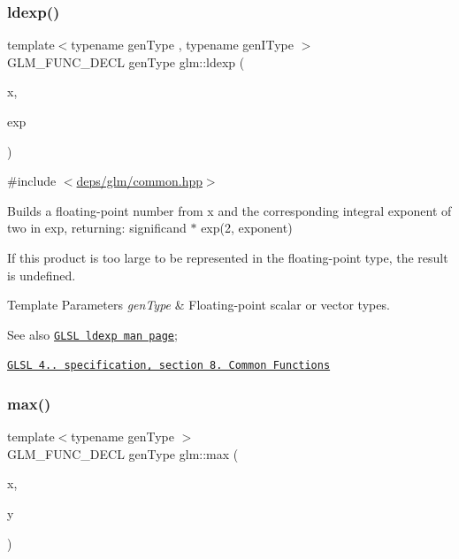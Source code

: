 \mbox{\label{group__core__func__common_ga52e319d7289b849ec92055abd4830533}} 
\subsubsection{\texorpdfstring{ldexp()}{ldexp()}}
{\footnotesize\ttfamily template$<$typename gen\+Type , typename gen\+I\+Type $>$ \\
G\+L\+M\+\_\+\+F\+U\+N\+C\+\_\+\+D\+E\+CL gen\+Type glm\+::ldexp (\begin{DoxyParamCaption}\item[{gen\+Type const \&}]{x,  }\item[{gen\+I\+Type const \&}]{exp }\end{DoxyParamCaption})}



{\ttfamily \#include $<$\hyperlink{common_8hpp}{deps/glm/common.\+hpp}$>$}

Builds a floating-\/point number from x and the corresponding integral exponent of two in exp, returning\+: significand $\ast$ exp(2, exponent)

If this product is too large to be represented in the floating-\/point type, the result is undefined.


\begin{DoxyTemplParams}{Template Parameters}
{\em gen\+Type} & Floating-\/point scalar or vector types.\\
\hline
\end{DoxyTemplParams}
\begin{DoxySeeAlso}{See also}
\href{http://www.opengl.org/sdk/docs/manglsl/xhtml/ldexp.xml}{\tt G\+L\+SL ldexp man page}; 

\href{http://www.opengl.org/registry/doc/GLSLangSpec.4.20.8.pdf}{\tt G\+L\+SL 4.. specification, section 8. Common Functions} 
\end{DoxySeeAlso}
\mbox{\label{group__core__func__common_ga98caa7f95a94c86a86ebce893a45326c}} 
\subsubsection{\texorpdfstring{max()}{max()}\hspace{0.1cm}{\footnotesize\ttfamily [1/3]}}
{\footnotesize\ttfamily template$<$typename gen\+Type $>$ \\
G\+L\+M\+\_\+\+F\+U\+N\+C\+\_\+\+D\+E\+CL gen\+Type glm\+::max (\begin{DoxyParamCaption}\item[{gen\+Type}]{x,  }\item[{gen\+Type}]{y }\end{DoxyParamCaption})}



